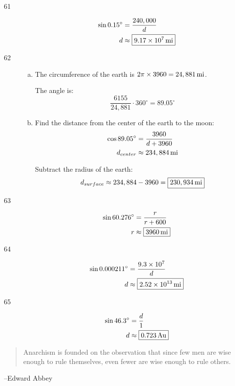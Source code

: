 \documentclass{exam}
\newcommand{\dg}{\ensuremath{^\circ}}
\begin{document}
\begin{description}
      \item[61]
        \begin{align*}
            \sin 0.15 \dg & = \frac{240,000}{d} \\
            d           & \approx \boxed{ \unit[ 9.17 \times 10^7 ]{mi} }  \\
        \end{align*}

      \item[62]
        \begin{enumerate}[(a)]
          \item The circumference of the earth is $2 \pi \times 3960 = \unit[24,881]{mi}$.

            The angle is:
            \[
              \frac{6155}{24,881} \cdot 360 \dg = \boxed{ 89.05 \dg }
            \]

          \item Find the distance from the center of the earth to the moon:
            \begin{align*}
              \cos 89.05 \dg & = \frac{3960}{d + 3960} \\
              d_{center}     & \approx \unit[ 234,884 ]{mi} \\
            \end{align*}

            Subtract the radius of the earth:
            \[
              d_{surface} \approx 234,884 - 3960 = \boxed{ \unit[230,934]{mi} } 
            \]

        \end{enumerate}

        \item[63]
          \begin{align*}
            \sin 60.276 \dg & = \frac{r}{r + 600} \\
            r               & \approx \boxed{ \unit[3960]{mi} } \\
          \end{align*}

        \item[64]
          \begin{align*}
            \sin 0.000211 \dg & = \frac{9.3 \times 10^7}{d} \\
            d               & \approx \boxed{ \unit[2.52 \times 10^{13}]{mi} } \\
          \end{align*}

        \item[65]
          \begin{align*}
            \sin 46.3 \dg & = \frac{d}{1} \\
            d             & \approx \boxed{ \unit[0.723]{Au} } \\
          \end{align*}

    \end{description}

  \else
    \vspace{7 cm}
    \begin{quote}
      \begin{em}
        Anarchism is founded on the observation that since few men are wise enough to rule themselves, even fewer are
        wise enough to rule others.  
      \end{em}
    \end{quote}
    \hspace{1 cm} --Edward Abbey
  \fi
\end{document}
